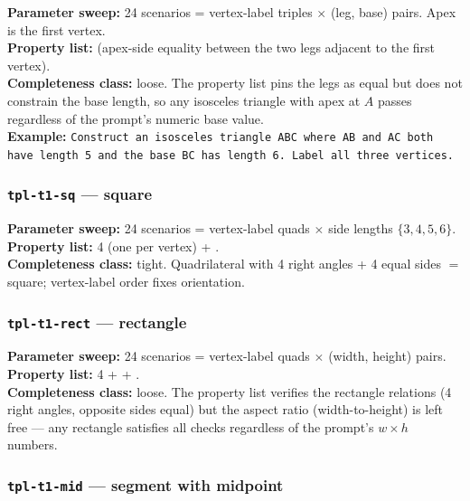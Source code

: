 \textbf{Parameter sweep:} 24 scenarios = vertex-label triples $\times$ (leg, base) pairs. Apex is the first vertex.\\
\textbf{Property list:}  (apex-side equality between the two legs adjacent to the first vertex).\\
\textbf{Completeness class:} loose. The property list pins the legs as equal but does not constrain the base length, so any isosceles triangle with apex at $A$ passes regardless of the prompt's numeric base value.\\
\textbf{Example:} \texttt{Construct an isosceles triangle ABC where AB and AC both have length 5 and the base BC has length 6. Label all three vertices.}

\subsubsection{\texttt{tpl-t1-sq} --- square}

\textbf{Parameter sweep:} 24 scenarios = vertex-label quads $\times$ side lengths $\{3,4,5,6\}$.\\
\textbf{Property list:} 4  (one per vertex) + .\\
\textbf{Completeness class:} tight. Quadrilateral with 4 right angles + 4 equal sides $=$ square; vertex-label order fixes orientation.

\subsubsection{\texttt{tpl-t1-rect} --- rectangle}

\textbf{Parameter sweep:} 24 scenarios = vertex-label quads $\times$ (width, height) pairs.\\
\textbf{Property list:} 4  +  + .\\
\textbf{Completeness class:} loose. The property list verifies the rectangle relations (4 right angles, opposite sides equal) but the aspect ratio (width-to-height) is left free --- any rectangle satisfies all checks regardless of the prompt's $w \times h$ numbers.

\subsubsection{\texttt{tpl-t1-mid} --- segment with midpoint}

